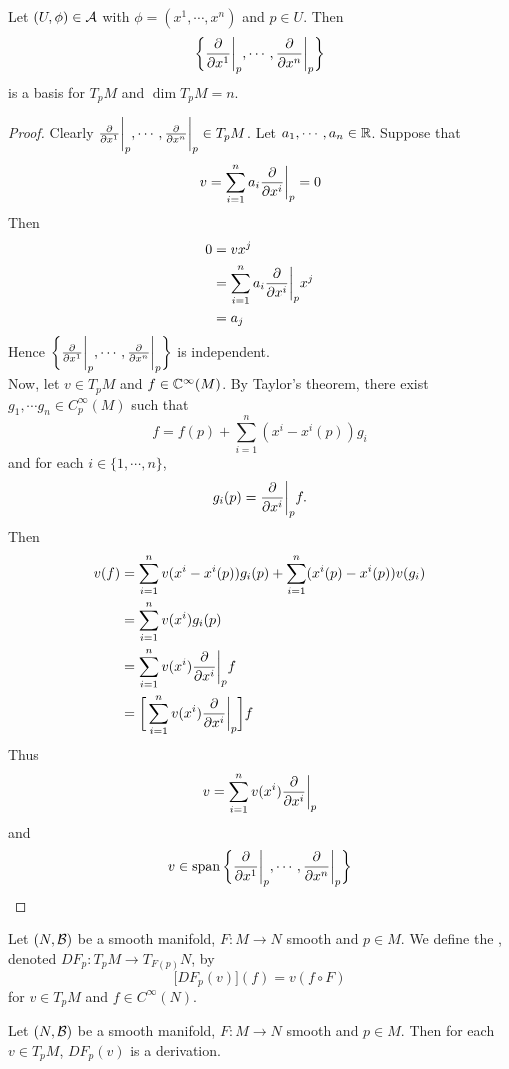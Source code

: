 \documentclass{book}
\begin{document}
	\begin{ex}
		Let $(U, \phi) \in \mathcal{A}$ with $\phi = (x^1, \cdots, x^n)$ and $p \in U$. Then 
		$$\bigg \{\frac{\partial}{\partial x^1} \bigg|_p, \cdots, \frac{\partial}{\partial x^n} \bigg|_p \bigg \}$$ is a basis for $T_pM$ and $\dim T_pM = n$.
	\end{ex}

	\begin{proof}
		Clearly $\frac{\partial}{\partial x^1} \bigg|_p, \cdots, \frac{\partial}{\partial x^n} \bigg|_p \in T_pM$. Let $a_1, \cdots, a_n \in \mathbb{R}$. Suppose that 
		$$v = \sum_{i=1}^n a_i \frac{\partial}{\partial x^i} \bigg |_p  = 0$$
		Then 
		\begin{align*}
			0
			& = v x^j \\
			& = \sum_{i=1}^n a_i \frac{\partial}{\partial x^i} \bigg |_p  x^j \\
			& = a_j
		\end{align*}
		Hence $\bigg \{\frac{\partial}{\partial x^1} \bigg|_p, \cdots, \frac{\partial}{\partial x^n} \bigg|_p \bigg \}$ is independent.\\
		Now, let $v \in T_pM$ and $f \in \mathbb{C}^{\infty}(M)$. By Taylor's theorem, there exist $g_1, \cdots g_n \in C_p^{\infty}(M)$ such that 
		$$f = f(p) + \sum_{i=1}^n(x^i - x^i(p)) g_i$$ and for each $i \in \{1, \cdots, n\}$, 
		$$g_i(p) = \frac{\partial}{\partial x^i} \bigg |_p  f. $$ 
		Then 
		\begin{align*}
			v(f)
			& = \sum_{i=1}^nv(x^i - x^i(p)) g_i(p) + \sum_{i=1}^n(x^i(p) - x^i(p)) v(g_i) \\
			& = \sum_{i=1}^nv(x^i)g_i(p) \\
			& = \sum_{i=1}^nv(x^i)\frac{\partial}{\partial x^i} \bigg |_p  f \\
			& = \bigg[ \sum_{i=1}^nv(x^i)\frac{\partial}{\partial x^i} \bigg |_p  \bigg] f
		\end{align*}
		Thus
		$$v = \sum_{i=1}^nv(x^i)\frac{\partial}{\partial x^i} \bigg |_p  $$ and $$v \in \operatorname{span} \bigg \{\frac{\partial}{\partial x^1} \bigg|_p, \cdots, \frac{\partial}{\partial x^n} \bigg|_p \bigg \}$$
	\end{proof}



	\begin{defn}
		Let $(N, \mathcal{B})$ be a smooth manifold, $F: M \rightarrow N$ smooth and $p \in M$. We define the , denoted $DF_p: T_pM \rightarrow T_{F(p)}N$, by $$\bigg[ DF_p(v) \bigg] (f) = v (f \circ F)$$  for $v \in T_pM$ and $f \in C^{\infty}(N)$.
	\end{defn}
	
	
	
	
	\begin{ex}
	Let $(N, \mathcal{B})$ be a smooth manifold, $F: M \rightarrow N$ smooth and $p \in M$. Then for each $v \in T_pM$, $DF_p(v)$ is a derivation.
	\end{ex}
	
\end{document}
